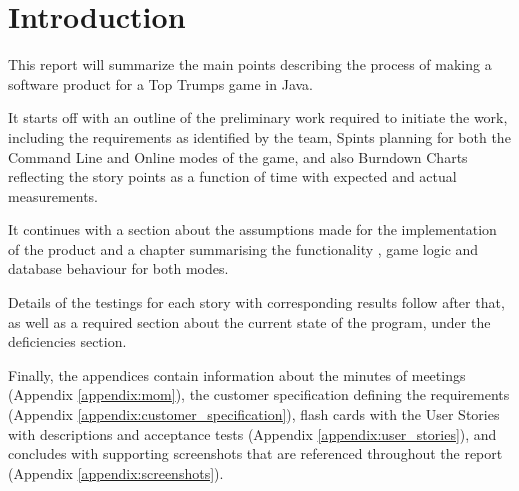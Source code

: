 \newpage
\section{Introduction}

This report will summarize the main points describing the process of making a software product for a Top Trumps game in Java.

It starts off with an outline of the preliminary work required to initiate the work, including the requirements as identified by the team, Spints planning for both the Command Line and Online modes of the game, and also Burndown Charts reflecting the story points as a function of time with expected and actual measurements.

It continues with a section about the assumptions made for the implementation of the product and a chapter summarising the functionality , game logic and database behaviour for both modes.

Details of the testings for each story with corresponding results follow after that, as well as a required section about the current state of the program, under the deficiencies section.

Finally, the appendices contain information about the minutes of meetings (Appendix \ref{appendix:mom}), the customer specification defining the requirements (Appendix \ref{appendix:customer_specification}), flash cards with the User Stories with descriptions and acceptance tests (Appendix \ref{appendix:user_stories}), and concludes with supporting screenshots that are referenced throughout the report (Appendix \ref{appendix:screenshots}).
